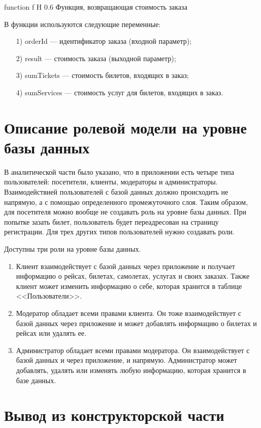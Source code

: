\documentclass{bmstu}
\begin{document}
    {function}
    {f}
    {H}
    {0.6\textwidth}
    {Функция, возвращающая стоимость заказа}

В функции используются следующие переменные:

\begin{enumerate}
\item[1)] orderId --- идентификатор заказа (входной параметр);
\item[2)] result --- стоимость заказа (выходной параметр);
\item[3)] sumTickets --- стоимость билетов, входящих в заказ;
\item[4)] sumServices --- стоимость услуг для билетов, входящих в заказ.
\end{enumerate}

\section{Описание ролевой модели на уровне базы данных}

В аналитической части было указано, что в приложении есть четыре типа пользователей: посетители, клиенты, модераторы и администраторы. 
Взаимодействией пользователей с базой данных должно происходить не напрямую, а с помощью определенного промежуточного слоя. 
Таким образом, для посетителя можно вообще не создавать роль на уровне базы данных. 
При попытке зазать билет, пользователь будет переадресован на страницу регистрации. 
Для трех других типов пользователей нужно создавать роли.

Доступны три роли на уровне базы данных.
\begin{enumerate}
\item Клиент взаимодействует с базой данных через приложение и получает информацию о рейсах, билетах, самолетах, услугах и своих заказах. 
Также клиент может изменить информацию о себе, которая хранится в таблице <<Пользователи>>.
\item Модератор обладает всеми правами клиента. 
Он тоже взаимодействует с базой данных через приложение и может добавлять информацию о билетах и рейсах или удалять ее. 
\item Администратор обладает всеми правами модератора. 
Он взаимодействует с базой данных и через приложение, и напрямую. 
Администратор может добавлять, удалять или изменять любую информацию, которая хранится в базе данных.
\end{enumerate}

\section*{Вывод из конструкторской части}
\end{document}
